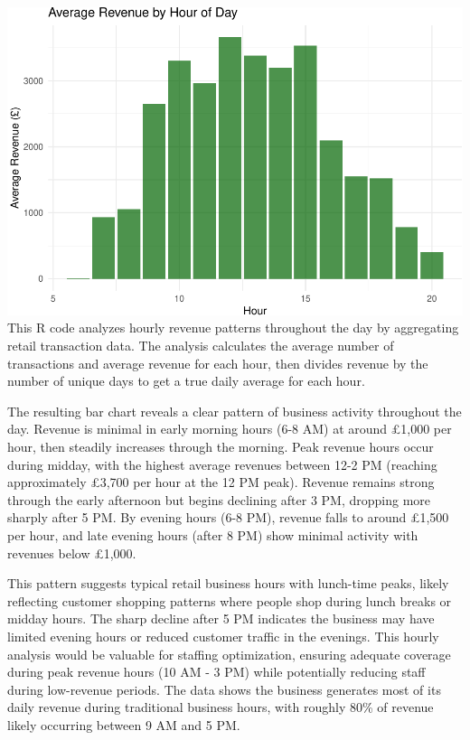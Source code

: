 \documentclass[
]{article}
\begin{document}
\includegraphics{capstone_customer_segmentation_files/figure-latex/exploratory-data-analysis6-1.pdf}
This R code analyzes hourly revenue patterns throughout the day by
aggregating retail transaction data. The analysis calculates the average
number of transactions and average revenue for each hour, then divides
revenue by the number of unique days to get a true daily average for
each hour.

The resulting bar chart reveals a clear pattern of business activity
throughout the day. Revenue is minimal in early morning hours (6-8 AM)
at around £1,000 per hour, then steadily increases through the morning.
Peak revenue hours occur during midday, with the highest average
revenues between 12-2 PM (reaching approximately £3,700 per hour at the
12 PM peak). Revenue remains strong through the early afternoon but
begins declining after 3 PM, dropping more sharply after 5 PM. By
evening hours (6-8 PM), revenue falls to around £1,500 per hour, and
late evening hours (after 8 PM) show minimal activity with revenues
below £1,000.

This pattern suggests typical retail business hours with lunch-time
peaks, likely reflecting customer shopping patterns where people shop
during lunch breaks or midday hours. The sharp decline after 5 PM
indicates the business may have limited evening hours or reduced
customer traffic in the evenings. This hourly analysis would be valuable
for staffing optimization, ensuring adequate coverage during peak
revenue hours (10 AM - 3 PM) while potentially reducing staff during
low-revenue periods. The data shows the business generates most of its
daily revenue during traditional business hours, with roughly 80\% of
revenue likely occurring between 9 AM and 5 PM.\newpage
\end{document}

